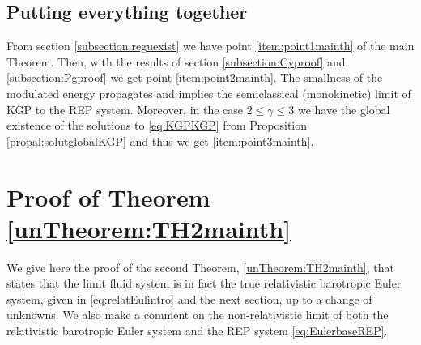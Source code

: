 \documentclass[a4paper, 15pt]{article}
\numberwithin{equation}{section}
\begin{document}
\subsection{Putting everything together}
From section \ref{subsection:reguexist} we have point \ref{item:point1mainth} of the main Theorem. Then, with the results of section \ref{subsection:Cyproof} and \ref{subsection:Pgproof} we get point \ref{item:point2mainth}. The smallness of the modulated energy propagates and implies the semiclassical (monokinetic) limit of KGP to the REP system. Moreover, in the case $2\leq\gamma\leq3$ we have the global existence of the solutions to \eqref{eq:KGPKGP} from Proposition \ref{propal:solutglobalKGP} and thus we get \ref{item:point3mainth}.

\section{Proof of Theorem \ref{unTheorem:TH2mainth}}
\label{section:relatEul}
We give here the proof of the second Theorem, \ref{unTheorem:TH2mainth}, that states that the limit fluid system is in fact the true relativistic barotropic Euler system, given in \eqref{eq:relatEulintro} and the next section, up to a change of unknowns. We also make a comment on the non-relativistic limit of both the relativistic barotropic Euler system and the REP system \eqref{eq:EulerbaseREP}.  
\end{document}
